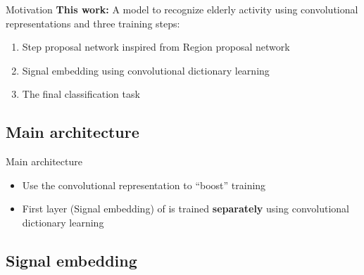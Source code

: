 \begin{frame}{Motivation}{}
    \textbf{This work:} A model to recognize elderly activity using convolutional representations and three training steps:
        \begin{enumerate}
            \item Step proposal network inspired from Region proposal network
            \item Signal embedding using convolutional dictionary learning
            \item The final classification task
        \end{enumerate}


\end{frame}

\subsection{Main architecture}

\begin{frame}{Main architecture}{}

    
\begin{itemize}
    \item Use the convolutional representation to ``boost'' training
    \item First layer (Signal embedding) of \algo is trained \textbf{separately} using convolutional dictionary learning
\end{itemize}
\end{frame}

\subsection{Signal embedding}

